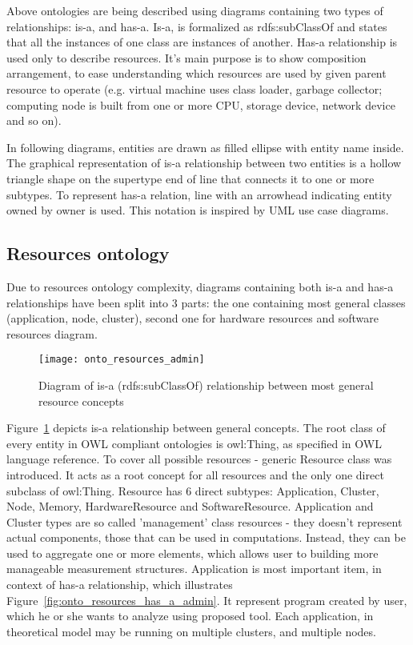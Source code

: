 Above ontologies are being described using diagrams containing two types of relationships: is-a, and has-a. Is-a, is
formalized as rdfs:subClassOf and states that all the instances of one class are instances of
another\cite{rdfRef:2004}. Has-a relationship is used only to describe resources. It's main purpose is to show
composition arrangement, to ease understanding which resources are used by given parent resource to operate (e.g.
virtual machine uses class loader, garbage collector; computing node is built from one or more CPU, storage device,
network device and so on).

In following diagrams, entities are drawn as filled ellipse with entity name inside. The graphical representation of
is-a relationship between two entities is a hollow triangle shape on the supertype end of line that connects it to one
or more subtypes. To represent has-a relation, line with an arrowhead indicating entity owned by owner is used. This
notation is inspired by UML use case diagrams.

\pagebreak

\subsection{Resources ontology}
\label{subsec:arch_knowledge_resources}

Due to resources ontology complexity, diagrams containing both is-a and has-a relationships have been split into 3
parts: the one containing most general classes (application, node, cluster), second one for hardware resources
and software resources diagram.

\begin{figure}[ht]
  \centering
  \texttt{[image: onto\_resources\_admin]}
  \caption{Diagram of is-a (rdfs:subClassOf) relationship between most general resource concepts}
  \label{fig:onto_resources_admin}
\end{figure}



Figure~\ref{fig:onto_resources_admin} depicts is-a relationship between general concepts. The root class of every
entity in OWL compliant ontologies is owl:Thing, as specified in OWL language reference\cite{owlRef:2004}. To cover all
possible resources - generic Resource class was introduced. It acts as a root concept for all resources and
the only one direct subclass of owl:Thing. Resource has 6 direct subtypes: Application, Cluster, Node, Memory,
HardwareResource and SoftwareResource. Application and Cluster types are so called 'management' class resources - they
doesn't represent actual components, those that can be used in computations. Instead, they can be used to aggregate one
or more elements, which allows user to building more manageable measurement structures. Application is most important
item, in context of has-a relationship, which illustrates Figure~\ref{fig:onto_resources_has_a_admin}. It represent
program created by user, which he or she wants to analyze using proposed tool. Each application, in theoretical model
may be running on multiple clusters, and multiple nodes.


